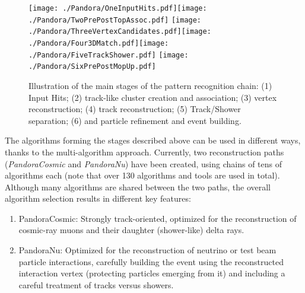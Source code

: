 \begin{figure}[!h!tbp]
\centering
\texttt{[image: ./Pandora/OneInputHits.pdf]}\texttt{[image: ./Pandora/TwoPrePostTopAssoc.pdf]}
\texttt{[image: ./Pandora/ThreeVertexCandidates.pdf]}\texttt{[image: ./Pandora/Four3DMatch.pdf]}\texttt{[image: ./Pandora/FiveTrackShower.pdf]}
\texttt{[image: ./Pandora/SixPrePostMopUp.pdf]}
\caption{Illustration of the main stages of the  pattern recognition chain: (1) Input Hits; (2) \twod track-like cluster creation and association; (3) \threed vertex reconstruction; (4) \threed track reconstruction; (5) Track/Shower separation; (6) \twod and \threed particle refinement and event building.}
\label{reco_steps}
\end{figure}

The algorithms forming the stages described above can be used in different ways, thanks to the multi-algorithm approach. Currently, two  reconstruction paths ({\it PandoraCosmic} and {\it PandoraNu}) have been created, using chains of tens of algorithms each (note that over 130 algorithms and tools are used in total). Although many algorithms are shared between the two paths, the overall algorithm selection results in different key features:
\begin{enumerate}
\item PandoraCosmic: Strongly track-oriented, optimized for the reconstruction of cosmic-ray muons and their daughter (shower-like) delta rays. 
\item PandoraNu: Optimized for the reconstruction of neutrino or test beam particle interactions, carefully building the event using the reconstructed interaction vertex (protecting particles emerging from it) and including a careful treatment of tracks versus showers. 
\end{enumerate}

